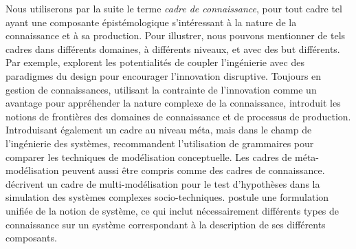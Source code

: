 {Nous utiliserons par la suite le terme \emph{cadre de connaissance}, pour tout cadre tel ayant une composante épistémologique s'intéressant à la nature de la connaissance et à sa production. Pour illustrer, nous pouvons mentionner de tels cadres dans différents domaines, à différents niveaux, et avec des but différents. Par exemple, \cite{durantin2017disruptive} explorent les potentialités de coupler l'ingénierie avec des paradigmes du design pour encourager l'innovation disruptive. Toujours en gestion de connaissances, utilisant la contrainte de l'innovation comme un avantage pour appréhender la nature complexe de la connaissance, \cite{carlile2004transferring} introduit les notions de frontières des domaines de connaissance et de processus de production. Introduisant également un cadre au niveau méta, mais dans le champ de l'ingénierie des systèmes, \cite{gemino2004framework} recommandent l'utilisation de grammaires pour comparer les techniques de modélisation conceptuelle. Les cadres de méta-modélisation peuvent aussi être compris comme des cadres de connaissance. \cite{cottineau2015modular} décrivent un cadre de multi-modélisation pour le test d'hypothèses dans la simulation des systèmes complexes socio-techniques. \cite{golden2012modeling} postule une formulation unifiée de la notion de système, ce qui inclut nécessairement différents types de connaissance sur un système correspondant à la description de ses différents composants.
}
 
